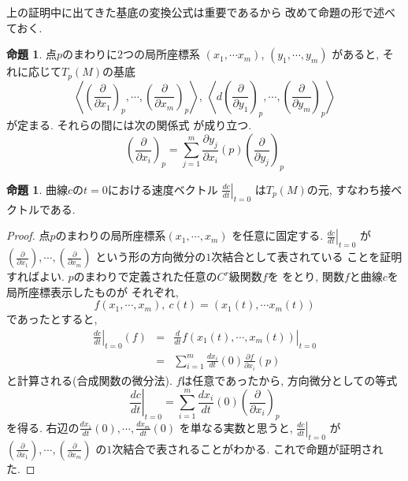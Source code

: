\documentclass[a4j,12pt]{jarticle}
\theoremstyle{definition}
\newtheorem{proposition}[theorem]{命題}
\begin{document}
    上の証明中に出てきた基底の変換公式は重要であるから
    改めて命題の形で述べておく. 
    \begin{proposition}\label{prop:basis conversion}
        点$p$のまわりに$2$つの局所座標系
        $(x_1,\cdots x_m)$, $(y_1,\cdots ,y_m)$
        があると, それに応じて$T_p(M)$の基底
        $$\left<\left(\frac{\partial}
        {\partial x_1}\right)_p,\cdots ,
        \left(\frac{\partial}
        {\partial x_m}\right)_p\right>,\ 
        \left<d\left(\frac{\partial}
        {\partial y_1}\right)_p,\cdots ,
        \left(\frac{\partial}
        {\partial y_m}\right)_p\right>$$
        が定まる. それらの間には次の関係式
        が成り立つ. 
        $$\left(\frac{\partial}{\partial x_i}\right)_p=
        \sum_{j=1}^{m}
        \frac{\partial y_j}{\partial x_i}(p)
        \left(\frac{\partial}{\partial y_j}\right)_p$$
    \end{proposition}
    \begin{proposition}\label{prop:dc/dt is tangent vector}
        曲線$c$の$t=0$における速度ベクトル
        $\left .\frac{dc}{dt}\right|_{t=0}$
        は$T_p(M)$の元, すなわち接ベクトルである. 
    \end{proposition}
    \begin{proof}
        点$p$のまわりの局所座標系$(x_1,\cdots ,x_m)$
        を任意に固定する. 
        $\left .\frac{dc}{dt}\right|_{t=0}$
        が$\left(\frac{\partial}{\partial x_1}\right), 
        \cdots ,
        \left(\frac{\partial}{\partial x_m}\right)$
        という形の方向微分の$1$次結合として表されている
        ことを証明すればよい. 
        $p$のまわりで定義された任意の$C^r$級関数$f$を
        をとり, 関数$f$と曲線$c$を局所座標表示したものが
        それぞれ, 
        $$f(x_1,\cdots ,x_m),\ 
        c(t)=(x_1(t),\cdots x_m(t))$$
        であったとすると, 
        \begin{eqnarray*}
            \left .\frac{dc}{dt}\right|_{t=0}(f)&=&
            \left .\frac{d}{dt}f(x_1(t),\cdots ,x_m(t))
            \right|_{t=0}\\
            &=&\sum_{i=1}^{m}\frac{dx_i}{dt}(0)
            \frac{\partial f}{\partial x_i}(p)
        \end{eqnarray*}
        と計算される(合成関数の微分法). 
        $f$は任意であったから, 方向微分としての等式
        $$\left .\frac{dc}{dt}\right|_{t=0}=
        \sum_{i=1}^{m}\frac{dx_i}{dt}(0)
            \left(\frac{\partial}{\partial x_i}
            \right)_p$$
        を得る. 右辺の$\frac{dx_1}{dt}(0), 
        \cdots ,\frac{dx_m}{dt}(0)$
        を単なる実数と思うと, 
        $\left .\frac{dc}{dt}\right|_{t=0}$
        が
        $\left(\frac{\partial}{\partial x_1}\right), 
        \cdots ,
        \left(\frac{\partial}{\partial x_m}\right)$
        の$1$次結合で表されることがわかる. 
        これで命題が証明された. 
    \end{proof}
\end{document}
